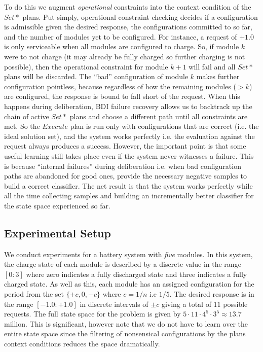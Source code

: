 To do this we augment {\em operational} constraints into the context condition of the $Set*$ plans. Put simply, operational constraint checking decides if a configuration is admissible given the desired response, the configurations committed to so far, and the number of modules yet to be configured. For instance, a request of $+1.0$ is only serviceable when all modules are configured to charge. So, if module $k$ were to not charge (it may already be fully charged so further charging is not possible), then the operational constraint for module $k+1$ will fail and all $Set*$ plans will be discarded. The ``bad'' configuration of module $k$ makes further configuration pointless, because regardless of how the remaining modules ($>k$) are configured, the response is bound to fall short of the request. When this happens during deliberation, BDI failure recovery allows us to backtrack up the chain of active $Set*$ plans and choose a different path until all constraints are met. So the $Execute$ plan is run only with configurations that are correct (i.e. the ideal solution set), and the system works perfectly i.e. the evaluation against the request always produces a success. However, the important point is that some useful learning still takes place even if the system never witnesses a failure. This is because ``internal failures'' during deliberation i.e. when bad configuration paths are abandoned for good ones, provide the necessary negative samples to build a correct classifier. The net result is that the system works perfectly while all the time collecting samples and building an incrementally better classifier for the state space experienced so far. 





\subsection{Experimental Setup}\label{subsec:setup}

We conduct experiments for a battery system with {\em five} modules. In this system, the charge state of each module is described by a discrete value in the range $[0:3]$ where zero indicates a fully discharged state and three indicates a fully charged state. As well as this, each module has an assigned configuration for the period from the set $\{+c, 0, -c\}$ where $c=1/n$ i.e $1/5$. The desired response is in the range $[-1.0:+1.0]$ in discrete intervals of $\pm c$ giving a total of $11$ possible requests. The full state space for the problem is given by $5 \cdot 11 \cdot 4^5 \cdot 3^5 \approx 13.7$ million. This is significant, however note that we do not have to learn over the entire state space since the filtering of nonsensical configurations by the plans context conditions reduces the space dramatically.

